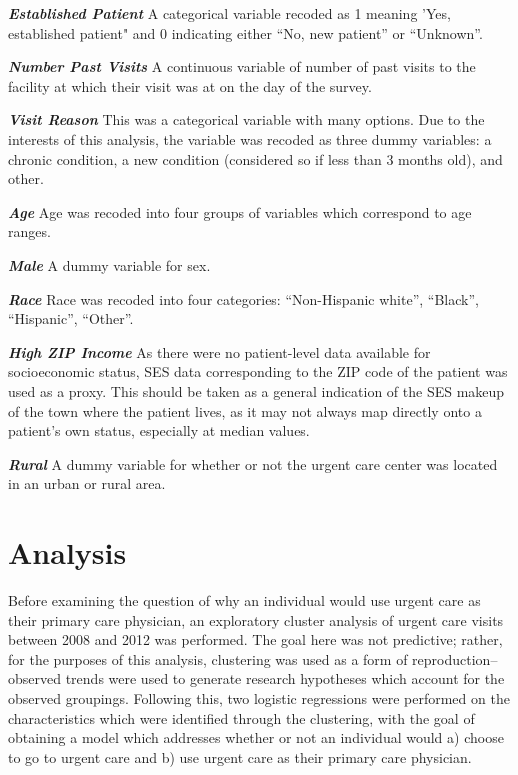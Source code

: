 \documentclass[12pt,twoside]{reedthesis}
\begin{document}
  \textbf{\emph{Established Patient}} A categorical variable recoded as 1
  meaning 'Yes, established patient" and 0 indicating either ``No, new
  patient'' or ``Unknown''.
  
  \textbf{\emph{Number Past Visits}} A continuous variable of number of
  past visits to the facility at which their visit was at on the day of
  the survey.
  
  \textbf{\emph{Visit Reason}} This was a categorical variable with many
  options. Due to the interests of this analysis, the variable was recoded
  as three dummy variables: a chronic condition, a new condition
  (considered so if less than 3 months old), and other.
  
  \textbf{\emph{Age}} Age was recoded into four groups of variables which
  correspond to age ranges.
  
  \textbf{\emph{Male}} A dummy variable for sex.
  
  \textbf{\emph{Race}} Race was recoded into four categories:
  ``Non-Hispanic white'', ``Black'', ``Hispanic'', ``Other''.
  
  \textbf{\emph{High ZIP Income}} As there were no patient-level data
  available for socioeconomic status, SES data corresponding to the ZIP
  code of the patient was used as a proxy. This should be taken as a
  general indication of the SES makeup of the town where the patient
  lives, as it may not always map directly onto a patient's own status,
  especially at median values.
  
  \textbf{\emph{Rural}} A dummy variable for whether or not the urgent
  care center was located in an urban or rural area.
  
  \chapter{Analysis}\label{analysis}
  
  \setcounter{chapter}{5} \setcounter{section}{0} \doublespacing
  
  Before examining the question of why an individual would use urgent care
  as their primary care physician, an exploratory cluster analysis of
  urgent care visits between 2008 and 2012 was performed. The goal here
  was not predictive; rather, for the purposes of this analysis,
  clustering was used as a form of reproduction--observed trends were used
  to generate research hypotheses which account for the observed
  groupings. Following this, two logistic regressions were performed on
  the characteristics which were identified through the clustering, with
  the goal of obtaining a model which addresses whether or not an
  individual would a) choose to go to urgent care and b) use urgent care
  as their primary care physician.
  
\end{document}
